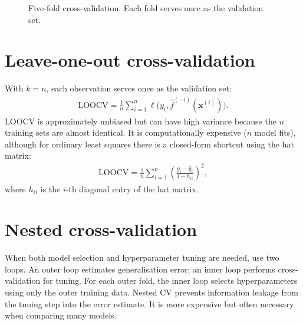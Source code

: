 \documentclass[a4paper, 12pt]{book}
\begin{document}
\begin{figure}[htbp]
\centering
{}
\caption{Five-fold cross-validation. Each fold serves once as the validation set.}
\label{fig:kfold}
\end{figure}

\section{Leave-one-out cross-validation}

With $k=n$, each observation serves once as the validation set:
\begin{align}
    \mathrm{LOOCV} = \frac{1}{n}\sum_{i=1}^n \ell\big(y_i, \hat{f}^{(-i)}(\mathbf{x}^{(i)})\big).
\end{align}
LOOCV is approximately unbiased but can have high variance because the $n$ training
sets are almost identical. It is computationally expensive ($n$ model fits), although
for ordinary least squares there is a closed-form shortcut using the hat matrix:
\begin{align}
    \mathrm{LOOCV} = \frac{1}{n}\sum_{i=1}^n
    \left(\frac{y_i-\hat{y}_i}{1-h_{ii}}\right)^2,
\end{align}
where $h_{ii}$ is the $i$-th diagonal entry of the hat matrix.

\section{Nested cross-validation}

When both model selection and hyperparameter tuning are needed, use two loops. An
outer loop estimates generalisation error; an inner loop performs cross-validation
for tuning. For each outer fold, the inner loop selects hyperparameters using only
the outer training data. Nested CV prevents information leakage from the tuning step
into the error estimate. It is more expensive but often necessary when comparing many
models.
\end{document}
